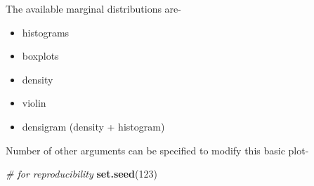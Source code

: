 \documentclass[]{article}
\newenvironment{Shaded}{\begin{snugshade}}{\end{snugshade}}
\newcommand{\CommentTok}[1]{\textcolor[rgb]{0.56,0.35,0.01}{\textit{#1}}}
\newcommand{\DecValTok}[1]{\textcolor[rgb]{0.00,0.00,0.81}{#1}}
\newcommand{\KeywordTok}[1]{\textcolor[rgb]{0.13,0.29,0.53}{\textbf{#1}}}
\newcommand{\NormalTok}[1]{#1}
\providecommand{\tightlist}{%
  \setlength{\itemsep}{0pt}\setlength{\parskip}{0pt}}
\begin{document}
The available marginal distributions are-

\begin{itemize}
\tightlist
\item
  histograms
\item
  boxplots
\item
  density
\item
  violin
\item
  densigram (density + histogram)
\end{itemize}

Number of other arguments can be specified to modify this basic plot-

\begin{Shaded}
\begin{Highlighting}[]
\CommentTok{# for reproducibility}
\KeywordTok{set.seed}\NormalTok{(}\DecValTok{123}\NormalTok{)}


\end{Highlighting}
\end{Shaded}
\end{document}
